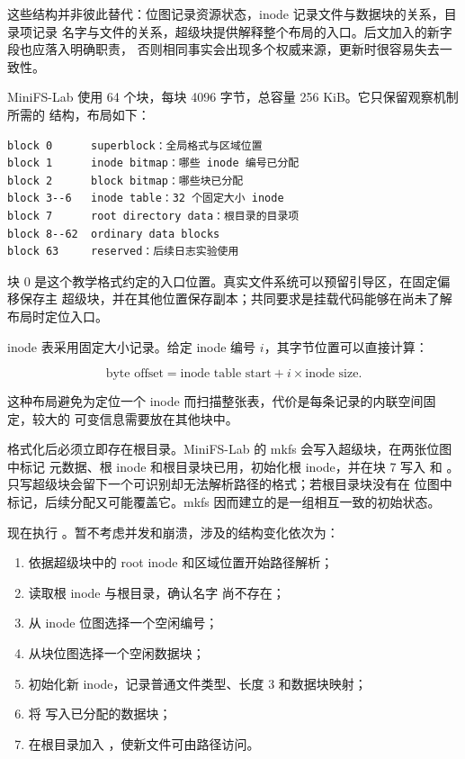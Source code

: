 这些结构并非彼此替代：位图记录资源状态，inode 记录文件与数据块的关系，目录项记录
名字与文件的关系，超级块提供解释整个布局的入口。后文加入的新字段也应落入明确职责，
否则相同事实会出现多个权威来源，更新时很容易失去一致性。


MiniFS-Lab 使用 64 个块，每块 4096 字节，总容量 256 KiB。它只保留观察机制所需的
结构，布局如下：

\begin{lstlisting}
block 0      superblock：全局格式与区域位置
block 1      inode bitmap：哪些 inode 编号已分配
block 2      block bitmap：哪些块已分配
block 3--6   inode table：32 个固定大小 inode
block 7      root directory data：根目录的目录项
block 8--62  ordinary data blocks
block 63     reserved：后续日志实验使用
\end{lstlisting}

块 0 是这个教学格式约定的入口位置。真实文件系统可以预留引导区，在固定偏移保存主
超级块，并在其他位置保存副本；共同要求是挂载代码能够在尚未了解布局时定位入口。

inode 表采用固定大小记录。给定 inode 编号 $i$，其字节位置可以直接计算：

\[
\text{byte offset}=\text{inode table start}+i\times\text{inode size}.
\]

这种布局避免为定位一个 inode 而扫描整张表，代价是每条记录的内联空间固定，较大的
可变信息需要放在其他块中。

格式化后必须立即存在根目录。MiniFS-Lab 的 mkfs 会写入超级块，在两张位图中标记
元数据、根 inode 和根目录块已用，初始化根 inode，并在块 7 写入  和
。只写超级块会留下一个可识别却无法解析路径的格式；若根目录块没有在
位图中标记，后续分配又可能覆盖它。mkfs 因而建立的是一组相互一致的初始状态。


现在执行 。暂不考虑并发和崩溃，涉及的结构变化依次为：

\begin{enumerate}\tightlist
\item 依据超级块中的 root inode 和区域位置开始路径解析；
\item 读取根 inode 与根目录，确认名字  尚不存在；
\item 从 inode 位图选择一个空闲编号；
\item 从块位图选择一个空闲数据块；
\item 初始化新 inode，记录普通文件类型、长度 3 和数据块映射；
\item 将  写入已分配的数据块；
\item 在根目录加入 ，使新文件可由路径访问。
\end{enumerate}

